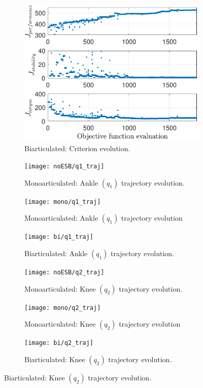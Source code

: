 \documentclass[letterpaper, 10 pt, conference]{ieeeconf}  %
\begin{document}
\begin{figure}[ht]
\begin{subfigure}[t]{0.32\linewidth}
		\end{subfigure}
		\begin{subfigure}[t]{0.32\linewidth}
			\includegraphics[width=\linewidth]{bi/crit_high}
			\caption{Biarticulated: Criterion evolution.}
			\label{fig:bi_crit_high}
		\end{subfigure}
		
		\vspace{1mm}
		
		\begin{subfigure}[t]{0.32\linewidth}
			\texttt{[image: noESB/q1\_traj]}
			\caption{Monoarticulated: Ankle $(q_1)$ trajectory evolution.}
			\label{fig:noESB_q1_traj}
		\end{subfigure}
		\begin{subfigure}[t]{0.32\linewidth}
			\texttt{[image: mono/q1\_traj]}
			\caption{Monoarticulated: Ankle $(q_1)$ trajectory evolution}
			\label{fig:mono_q1_traj}
		\end{subfigure}
		\begin{subfigure}[t]{0.32\linewidth}
			\texttt{[image: bi/q1\_traj]}
			\caption{Biarticulated: Ankle $(q_1)$ trajectory evolution.}
			\label{fig:bi_q1_traj}
		\end{subfigure}
		
		\vspace{1mm}
		
		\begin{subfigure}[t]{0.32\linewidth}
			\texttt{[image: noESB/q2\_traj]}
			\caption{Monoarticulated: Knee $(q_2)$ trajectory evolution.}
			\label{fig:noESB_q2_traj}
		\end{subfigure}
		\begin{subfigure}[t]{0.32\linewidth}
			\texttt{[image: mono/q2\_traj]}
			\caption{Monoarticulated: Knee $(q_2)$ trajectory evolution}
			\label{fig:mono_q2_traj}
		\end{subfigure}
		\begin{subfigure}[t]{0.32\linewidth}
			\texttt{[image: bi/q2\_traj]}
			\caption{Biarticulated: Knee $(q_2)$ trajectory evolution.}
			\label{fig:bi_q2_traj}
		\end{subfigure}
		

\end{figure}
\end{document}
